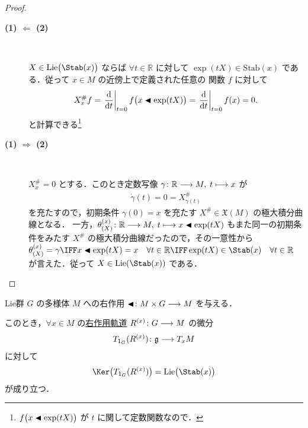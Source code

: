 \documentclass[geometry_main]{subfiles}
\begin{document}
\begin{proof}
    \begin{description}
        \item[\textbf{(1) $\bm{\Longleftarrow}$ (2)}]　
        
        $X \in \mathrm{Lie}\bigl(\Stab (x)\bigr)$ ならば $\forall t \in \mathbb{R}$ に対して $\exp (tX) \in \mathrm{Stab} (x)$ である．従って $x \in M$ の近傍上で定義された任意の \cinfty 関数 $f$ に対して
        \begin{align}
            X^\#_x f = \eval{\dv{}{t}}_{t=0} f\bigl(x \btl \exp(tX)\bigr) = \eval{\dv{}{t}}_{t=0} f(x) = 0.
        \end{align}
        と計算できる\footnote{$f\bigl(x \blacktriangleleft \exp(tX)\bigr)$ が $t$ に関して定数関数なので．}
        \item[\textbf{(1) $\bm{\Longrightarrow}$ (2)}]　
        
        $X^\#_x = 0$ とする．このとき定数写像 $\gamma \colon \mathbb{R} \longrightarrow M,\; t \longmapsto x$ が
        \begin{align}
            \dot{\gamma}(t) = 0 = X^\#_{\gamma(t)}
        \end{align}
        を充たすので，初期条件 $\gamma(0) = x$ を充たす $X^\# \in \mathfrak{X}(M)$ の極大積分曲線となる．
        一方，$\theta_{(X)}^{(x)} \colon \mathbb{R} \longrightarrow M,\; t \longmapsto x \blacktriangleleft \exp(tX)$ もまた同一の初期条件をみたす $X^\#$ の極大積分曲線だったので，その一意性から $\theta_{(X)}^{(x)} = \gamma \IFF x \btl \exp(tX) = x\quad \forall t \in \mathbb{R} \IFF \exp(tX) \in \Stab(x)\quad \forall t \in \mathbb{R}$ が言えた．従って $X \in \mathrm{Lie}(\Stab(x))$ である．

    \end{description}
\end{proof}

\begin{mycol}[label=col:fundamental-vecf-basic]{}
    Lie群 $G$ の\cinfty 多様体 $M$ への右作用 $\blacktriangleleft \colon M \times G \longrightarrow M$ を与える．

    このとき，$\forall x \in M$ の\hyperref[def:fundamental-vecf]{右作用軌道} $R^{(x)} \colon G \longrightarrow M$ の微分
    \begin{align}
        T_{1_G} (R^{(x)}) \colon \mathfrak{g} \longrightarrow T_x M
    \end{align}
    に対して
    \begin{align}
        \Ker \bigl( T_{1_G}(R^{(x)}) \bigr) = \mathrm{Lie} \bigl( \Stab(x) \bigr) 
    \end{align}
    が成り立つ．
\end{mycol}
\end{document}
